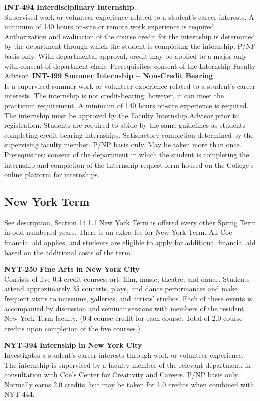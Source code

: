 \documentclass[
  letterpaper,
]{scrbook}
\begin{document}
\textbf{INT-494 Interdisciplinary Internship}\\
Supervised work or volunteer experience related to a student's career
interests. A minimum of 140 hours on-site or remote work experience is
required. Authorization and evaluation of the course credit for the
internship is determined by the department through which the student is
completing the internship. P/NP basis only. With departmental approval,
credit may be applied to a major only with consent of department chair.
Prerequisites: consent of the Internship Faculty Advisor.
\textbf{INT-499 Summer Internship -- Non-Credit Bearing}\\
Is a supervised summer work or volunteer experience related to a
student's career interests. The internship is not credit-bearing;
however, it can meet the practicum requirement. A minimum of 140 hours
on-site experience is required. The internship must be approved by the
Faculty Internship Advisor prior to registration. Students are required
to abide by the same guidelines as students completing credit-bearing
internships. Satisfactory completion determined by the supervising
faculty member. P/NP basis only. May be taken more than once.
Prerequisites: consent of the department in which the student is
completing the internship and completion of the Internship request form
housed on the College's online platform for internships.

\subsection{New York Term}\label{new-york-term-1}

See description, Section 14.1.1 New York Term is offered every other
Spring Term in odd-numbered years. There is an extra fee for New York
Term. All Coe financial aid applies, and students are eligible to apply
for additional financial aid based on the additional costs of the term.

\textbf{NYT-250 Fine Arts in New York City}\\
Consists of five 0.4-credit courses: art, film, music, theatre, and
dance. Students attend approximately 35 concerts, plays, and dance
performances and make frequent visits to museums, galleries, and
artists' studios. Each of these events is accompanied by discussion and
seminar sessions with members of the resident New York Term faculty.
(0.4 course credit for each course. Total of 2.0 course credits upon
completion of the five courses.)

\textbf{NYT-394 Internship in New York City}\\
Investigates a student's career interests through work or volunteer
experience. The internship is supervised by a faculty member of the
relevant department, in consultation with Coe's Center for Creativity
and Careers. P/NP basis only. Normally earns 2.0 credits, but may be
taken for 1.0 credits when combined with NYT-444.
\end{document}
